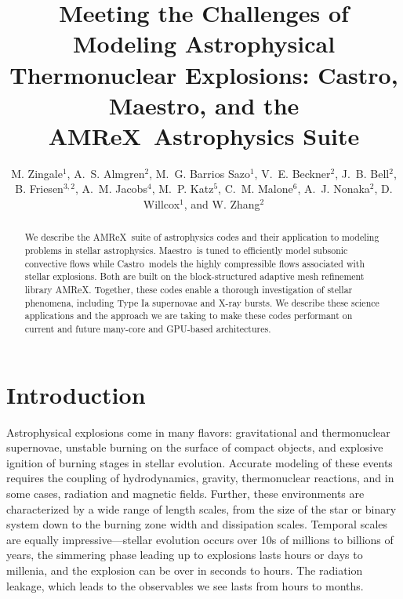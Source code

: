 \documentclass[a4paper]{jpconf}
\newcommand{\maestro}{{\sffamily Maestro}}
\newcommand{\castro}{{\sffamily Castro}}
\newcommand{\amrex}{{\sffamily AMReX}}
\begin{document}
\title{Meeting the Challenges of Modeling Astrophysical Thermonuclear Explosions:
\castro, \maestro, and the \amrex\ Astrophysics Suite}

\author{M. Zingale$^1$,
        A.~S. Almgren$^2$,
        M.~G. Barrios Sazo$^1$,
        V.~E. Beckner$^2$,
        J.~B. Bell$^2$,
        B. Friesen$^{3,2}$,
        A.~M. Jacobs$^4$,
        M.~P. Katz$^5$,
        C.~M. Malone$^6$,
        A.~J. Nonaka$^2$,
        D. Willcox$^1$, and
        W. Zhang$^2$}

\address{$^1$Department of Physics and Astronomy, Stony Brook
  University, Stony Brook, NY 11794-3800 USA}

\address{$^2$Center for Computational Sciences and Engineering,
  Lawrence Berkeley National Lab, Berkeley, CA 94720 USA}

\address{$^3$National Energy Research Scientific Computing Center,
  Lawrence Berkeley National Lab, Berkeley, CA 94720 USA}

\address{$^4$Department of Physics and Astronomy, Michigan State
  University, East Lansing, Michigan 48824 USA}

\address{$^5$Nvidia Corporation}

\address{$^6$Los Alamos National Laboratory, Los Alamos, NM, 87545 USA}

\begin{abstract}
We describe the \amrex\ suite of astrophysics codes and their
application to modeling problems in stellar astrophysics.
\maestro\ is tuned to efficiently model subsonic convective flows
while \castro\ models the highly compressible flows associated with
stellar explosions.  Both are built on the block-structured adaptive
mesh refinement library \amrex.  Together, these codes enable a
thorough investigation of stellar phenomena, including Type Ia
supernovae and X-ray bursts.  We describe these science applications
and the approach we are taking to make these codes performant on
current and future many-core and GPU-based architectures.
\end{abstract}




\section{Introduction}

Astrophysical explosions come in many flavors: gravitational and
thermonuclear supernovae, unstable burning on the surface of compact
objects, and explosive ignition of burning stages in stellar
evolution.  Accurate modeling of these events requires the coupling of
hydrodynamics, gravity, thermonuclear reactions, and in some cases,
radiation and magnetic fields.  Further, these environments are
characterized by a wide range of length scales, from the size of the
star or binary system down to the burning zone width and dissipation
scales.  Temporal scales are equally impressive---stellar evolution
occurs over 10s of millions to billions of years, the simmering phase
leading up to explosions lasts hours or days to millenia, and the
explosion can be over in seconds to hours.  The radiation leakage,
which leads to the observables we see lasts from hours to months.
\end{document}
